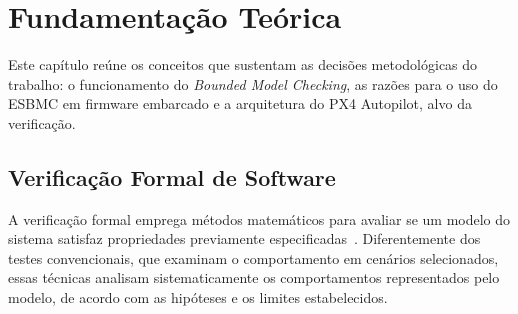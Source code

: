 \chapter{Fundamentação Teórica}
\label{cap:fundamentacao}

Este capítulo reúne os conceitos que sustentam as decisões metodológicas do
trabalho: o funcionamento do \textit{Bounded Model Checking}, as razões para o
uso do ESBMC em firmware embarcado e a arquitetura do PX4 Autopilot, alvo da
verificação.

\section{Verificação Formal de Software}

A verificação formal emprega métodos matemáticos para avaliar se um modelo do
sistema satisfaz propriedades previamente especificadas~\cite{Clarke1986}.
Diferentemente dos testes convencionais, que examinam o comportamento em cenários
selecionados, essas técnicas analisam sistematicamente os comportamentos
representados pelo modelo, de acordo com as hipóteses e os limites estabelecidos.

